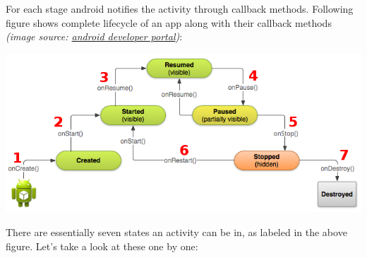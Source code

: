 For each stage android notifies the activity through callback methods. Following figure shows complete lifecycle of an app along with their callback methods \textit{(image source: \href{https://developer.android.com/images/training/basics/basic-lifecycle.png}{android developer portal})}:

\begin{center}
	\includegraphics[scale=0.5]{chapters/ch08/images/1}
\end{center}

There are essentially seven states an activity can be in, as labeled in the above figure. Let's take a look at these one by one:

